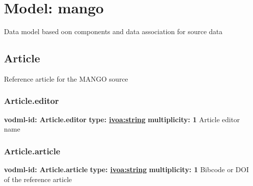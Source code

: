 
%



    
    
    
    
    
    
      

\pagebreak
\section{Model: mango }
  

  Data model based oon components and data association for source data

  \subsection{Article}
  \label{sect:Article}
    Reference article for the MANGO source

    \subsubsection{Article.editor}
      \textbf{vodml-id: Article.editor} \newline
      \textbf{type: \hyperref[sect:ivoa]{ivoa:string}} \newline
      \textbf{multiplicity: 1} \newline 
      Article editor name

    \subsubsection{Article.article}
      \textbf{vodml-id: Article.article} \newline
      \textbf{type: \hyperref[sect:ivoa]{ivoa:string}} \newline
      \textbf{multiplicity: 1} \newline 
      Bibcode or DOI of the reference article

